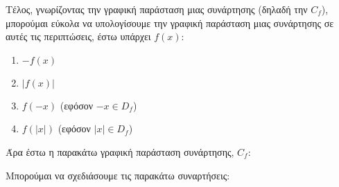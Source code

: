 
Τέλος, γνωρίζοντας την γραφική παράσταση μιας συνάρτησης (δηλαδή την $C_{f}$), μπορούμαι εύκολα να υπολογίσουμε την γραφική παράσταση μιας συνάρτησης σε αυτές τις περιπτώσεις, έστω υπάρχει $f(x)$:
\begin{enumerate}
 \item $-f(x)$
 \item $\vert f(x) \vert$
 \item $f(-x)$ (εφόσον $-x \in D_{f}$)
 \item $f(\vert x\vert)$ (εφόσον $\vert x\vert \in D_{f}$)
\end{enumerate}

Άρα έστω η παρακάτω γραφική παράσταση συνάρτησης, $C_{f}$:

\begin{center}
\end{center}

Μπορούμαι να σχεδιάσουμε τις παρακάτω συναρτήσεις:

